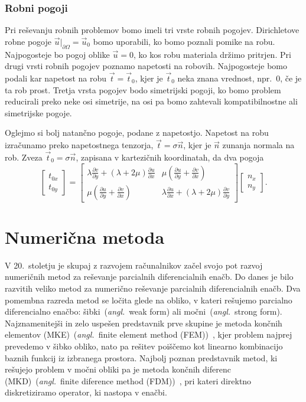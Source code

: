 \documentclass[12pt,a4paper,twoside]{article}
\theoremstyle{definition} %
\theoremstyle{plain} %
\numberwithin{equation}{section}
\newcommand{\dpar}[2]{\ensuremath{\frac{\partial #1}{\partial #2}}}
\newcommand{\vt}{\vec{t}}
\newcommand{\vu}{\vec{u}}
\newcommand{\vn}{\vec{n}}
\newcommand{\ts}{\sigma}
\newcommand{\ang}[1]{(\textit{angl.}\ #1)}
\begin{document}
\subsubsection{Robni pogoji}
Pri reševanju robnih problemov bomo imeli tri vrste robnih pogojev. Dirichletove robne pogoje
$\vu|_{\partial \Omega} = \vu_0$ bomo uporabili, ko bomo poznali pomike na robu. Najpogosteje bo pogoj
oblike $\vu = 0$, ko kos robu materiala držimo pritrjen.  Pri drugi vrsti robnih pogojev poznamo
napetosti na robovih.  Najpogosteje bomo podali kar napetost na robu $\vt = \vt_0$, kjer je $\vt_0$
neka znana vrednost, npr.~0, če je ta rob prost. Tretja vrsta pogojev bodo simetrijski pogoji, ko
bomo problem reducirali preko neke osi simetrije, na osi pa bomo zahtevali kompatibilnostne ali
simetrijske pogoje.

Oglejmo si bolj natančno pogoje, podane z napetostjo. Napetost na robu izračunamo preko napetostnega
tenzorja, $\vt = \ts\vn$, kjer je $\vn$ zunanja normala na rob. Zveza $\vt_0 = \ts\vn$, zapisana v
kartezičnih koordinatah, da dva pogoja
\begin{equation}
  \begin{bmatrix}
    t_{0x} \\ t_{0y}
  \end{bmatrix}
  =
  \begin{bmatrix}
    \lambda \dpar{v}{y} + (\lambda+2\mu) \dpar{u}{x} &
    \mu(\dpar{u}{y} + \dpar{v}{x}) \\
    \mu(\dpar{u}{y} + \dpar{v}{x}) &
    \lambda \dpar{u}{x} + (\lambda+2\mu) \dpar{v}{y}
  \end{bmatrix}
  \begin{bmatrix}
    n_x \\ n_y
  \end{bmatrix}.
\end{equation}

\section{Numerična metoda}
\label{sec:numericna-metoda}

V 20.~stoletju je skupaj z razvojem računalnikov začel svojo pot razvoj numeričnih metod za
reševanje parcialnih diferencialnih enačb. Do danes je bilo razvitih veliko metod za numerično
reševanje parcialnih diferencialnih enačb. Dva pomembna razreda metod se ločita glede na obliko, v
kateri rešujemo parcialno diferencialno enačbo: šibki~\ang{weak form} ali močni~\ang{strong form}.
Najznamenitejši in zelo uspešen predstavnik prve skupine je metoda končnih elementov
(MKE)~\ang{finite element method (FEM)}~\cite[str.\ 340]{kozak2008numericna}, kjer problem najprej
prevedemo v šibko obliko, nato pa rešitev poiščemo kot linearno kombinacijo baznih funkcij iz
izbranega prostora. Najbolj poznan predstavnik metod, ki rešujejo problem v močni obliki pa je
metoda končnih diferenc (MKD)~\ang{finite diference method (FDM)}~\cite[str.
296]{kozak2008numericna}, pri kateri direktno diskretiziramo operator, ki nastopa v enačbi.
\end{document}
